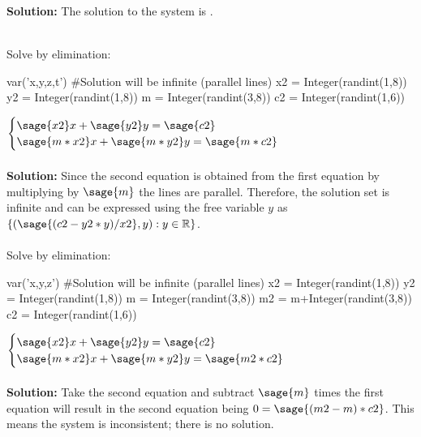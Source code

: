 \documentclass{ximera}
\begin{document}
\begin{shuffle}
\begin{question}
{\bf Solution:} The solution to the system is 
.\\\\
\end{question}

\end{shuffle}


Solve by elimination:
\begin{sagesilent}
var('x,y,z,t')
#Solution will be infinite (parallel lines)
x2 = Integer(randint(1,8))
y2 = Integer(randint(1,8))
m = Integer(randint(3,8))
c2 = Integer(randint(1,6))
\end{sagesilent}
$\begin{cases}
\sage{x2}x+\sage{y2}y=\sage{c2}\\
\sage{m*x2}x+\sage{m*y2}y=\sage{m*c2}\\
\end{cases}$\\\\
{\bf Solution:} Since the second equation is obtained from the first equation
by multiplying by $\sage{m}$ the lines are parallel. Therefore, the solution
set is infinite and can be expressed using the free variable $y$ as
$\{(\sage{(c2-y2*y)/x2}, y):y \in \mathbb{R}\}$.\\\\


Solve by elimination:
\begin{sagesilent}
var('x,y,z')
#Solution will be infinite (parallel lines)
x2 = Integer(randint(1,8))
y2 = Integer(randint(1,8))
m = Integer(randint(3,8))
m2 = m+Integer(randint(3,8))
c2 = Integer(randint(1,6))
\end{sagesilent}
$\begin{cases}
\sage{x2}x+\sage{y2}y=\sage{c2}\\
\sage{m*x2}x+\sage{m*y2}y=\sage{m2*c2}\\
\end{cases}$\\\\
{\bf Solution:} Take the second equation and subtract $\sage{m}$ times the
first equation will result in the second equation being $0=\sage{(m2-m)*c2}$.
This means the system is inconsistent; there is no solution.\\\\
\end{document}
